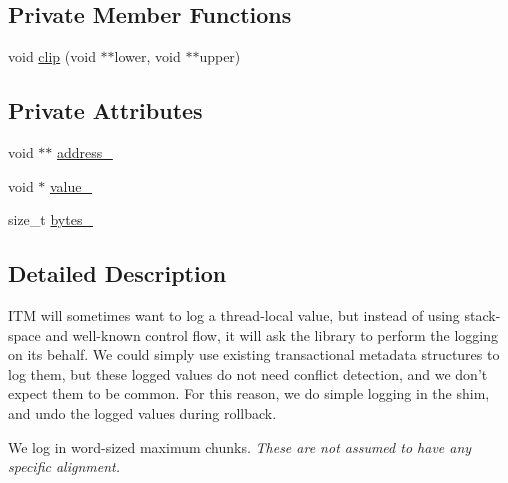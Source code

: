 \subsection*{Private Member Functions}
\begin{DoxyCompactItemize}
\item 
void \hyperlink{structitm2stm_1_1Scope_1_1LoggedWord_ae9e8ba50b0407ec0c10c299d4422a9b7}{clip} (void $\ast$$\ast$lower, void $\ast$$\ast$upper)
\end{DoxyCompactItemize}
\subsection*{Private Attributes}
\begin{DoxyCompactItemize}
\item 
void $\ast$$\ast$ \hyperlink{structitm2stm_1_1Scope_1_1LoggedWord_a2e34bed1d68bf7796977878e87746a3c}{address\-\_\-}
\item 
void $\ast$ \hyperlink{structitm2stm_1_1Scope_1_1LoggedWord_af683b956944064aeec6cd04c08916628}{value\-\_\-}
\item 
size\-\_\-t \hyperlink{structitm2stm_1_1Scope_1_1LoggedWord_ac8f7885001bbcd034edc803d665a7bd1}{bytes\-\_\-}
\end{DoxyCompactItemize}


\subsection{Detailed Description}
I\-T\-M will sometimes want to log a thread-\/local value, but instead of using stack-\/space and well-\/known control flow, it will ask the library to perform the logging on its behalf. We could simply use existing transactional metadata structures to log them, but these logged values do not need conflict detection, and we don't expect them to be common. For this reason, we do simple logging in the shim, and undo the logged values during rollback.

We log in word-\/sized maximum chunks. {\itshape These are not assumed to have any specific alignment.} 

